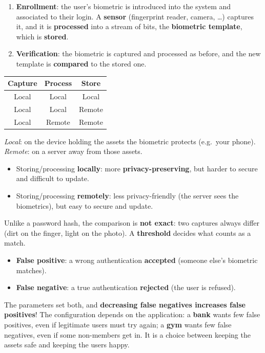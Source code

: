 \begin{defnbox}[title=Biometric authentication: enrollment and verification]
\begin{enumerate}
  \item \textbf{Enrollment}: the user's biometric is introduced into the system and associated to
        their login. A \textbf{sensor} (fingerprint reader, camera, \ldots) captures it, and it is
        \textbf{processed} into a stream of bits, the \textbf{biometric template}, which is
        \textbf{stored}.
  \item \textbf{Verification}: the biometric is captured and processed as before, and the new
        template is \textbf{compared} to the stored one.
\end{enumerate}
\end{defnbox}

\begin{propbox}[title={Where do capture, process and store happen?}]
\begin{center}
\begin{tabular}{c|c|c}
\textbf{Capture} & \textbf{Process} & \textbf{Store} \\ \hline
Local & Local  & Local  \\
Local & Local  & Remote \\
Local & Remote & Remote
\end{tabular}
\end{center}
\emph{Local}: on the device holding the assets the biometric protects (e.g.\ your phone).
\emph{Remote}: on a server away from those assets.
\begin{itemize}
  \item Storing/processing \textbf{locally}: more \textbf{privacy-preserving}, but harder to
        secure and difficult to update.
  \item Storing/processing \textbf{remotely}: less privacy-friendly (the server sees the
        biometrics), but easy to secure and update.
\end{itemize}
\end{propbox}

\begin{defnbox}[title=False positives and false negatives]
Unlike a password hash, the comparison is \textbf{not exact}: two captures always differ (dirt on
the finger, light on the photo). A \textbf{threshold} decides what counts as a match.
\begin{itemize}
  \item \textbf{False positive}: a wrong authentication \textbf{accepted} (someone else's
        biometric matches).
  \item \textbf{False negative}: a true authentication \textbf{rejected} (the user is refused).
\end{itemize}
The parameters set both, and \textbf{decreasing false negatives increases false positives}! The
configuration depends on the application: a \textbf{bank} wants few false positives, even if
legitimate users must try again; a \textbf{gym} wants few false negatives, even if some non-members
get in. It is a choice between keeping the assets safe and keeping the users happy.
\end{defnbox}

